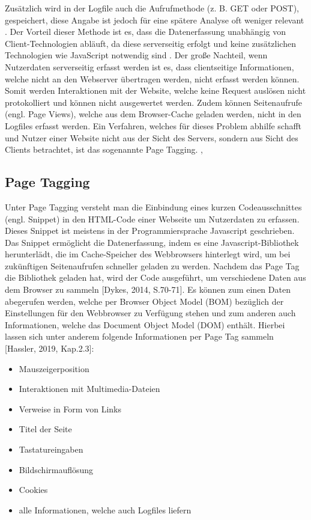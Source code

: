 Zusätzlich wird in der Logfile auch die Aufrufmethode (z. B. GET oder POST),  gespeichert, diese Angabe ist jedoch für eine spätere Analyse oft weniger relevant \parencite[Kap.2.2]{Hassler2019}. Der Vorteil dieser Methode ist es, dass die Datenerfassung unabhängig von Client-Technologien abläuft, da diese serverseitig erfolgt und keine zusätzlichen Technologien wie JavaScript notwendig sind \parencite{RyteLogFiles}. Der große Nachteil, wenn Nutzerdaten serverseitig erfasst werden ist es, dass clientseitige Informationen, welche nicht an den Webserver übertragen werden, nicht erfasst werden können. Somit werden Interaktionen mit der Website, welche keine Request auslösen nicht protokolliert und können nicht ausgewertet werden. Zudem können Seitenaufrufe (engl. Page Views), welche aus dem Browser-Cache geladen werden, nicht in den Logfiles erfasst werden. Ein Verfahren, welches für dieses Problem abhilfe schafft und Nutzer einer Website nicht aus der Sicht des Servers, sondern aus Sicht des Clients betrachtet, ist das sogenannte Page Tagging. \parencite{CounterCodePageTagging}, \parencite{CounterCodeLogFiles}

\subsection{Page Tagging}
\label{sec:pagetagging}
Unter Page Tagging versteht man die Einbindung eines kurzen Codeausschnittes (engl. Snippet) in den HTML-Code einer Webseite um Nutzerdaten zu erfassen. Dieses Snippet ist meistens in der Programmiersprache Javascript geschrieben. Das Snippet ermöglicht die Datenerfassung, indem es eine Javascript-Bibliothek herunterlädt, die im Cache-Speicher des Webbrowsers hinterlegt wird, um bei zukünftigen Seitenaufrufen schneller geladen zu werden. Nachdem das Page Tag die Bibliothek geladen hat, wird der Code ausgeführt, um verschiedene Daten aus dem Browser zu sammeln [Dykes, 2014, S.70-71]. Es können zum einen Daten abegerufen werden, welche per Browser Object Model (BOM) bezüglich der Einstellungen für den Webbrowser zu Verfügung stehen und zum anderen auch Informationen, welche das Document Object Model (DOM) enthält. Hierbei lassen sich unter anderem folgende Informationen per Page Tag sammeln [Hassler, 2019, Kap.2.3]:  

\begin{itemize}
    \item Mauszeigerposition
    \item Interaktionen mit Multimedia-Dateien
    \item Verweise in Form von Links
    \item Titel der Seite
    \item Tastatureingaben
    \item Bildschirmauflösung
    \item Cookies
    \item alle Informationen, welche auch Logfiles liefern
\end{itemize}

